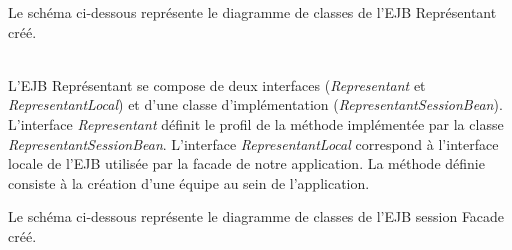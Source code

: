 \documentclass[10pt]{report}
\begin{document}
\newpage
Le schéma ci-dessous représente le diagramme de classes de l'EJB Représentant créé. \\
	\begin{figure}[hp]
	      \begin{center}
	      \end{center}
	\end{figure}
\\
	
L'EJB Représentant se compose de deux interfaces (\textit{Representant} et \textit{RepresentantLocal}) et d'une classe d'implémentation (\textit{RepresentantSessionBean}). L'interface \textit{Representant} définit le profil de la méthode implémentée par la classe \textit{RepresentantSessionBean}. L'interface \textit{RepresentantLocal} correspond à l'interface locale de l'EJB utilisée par la facade de notre application. La méthode définie consiste à la création d'une équipe au sein de l'application.

\newpage
Le schéma ci-dessous représente le diagramme de classes de l'EJB session Facade créé. \\
	\begin{figure}[hp]
	      \begin{center}
	      \end{center}
	\end{figure}	
\\
\end{document}
